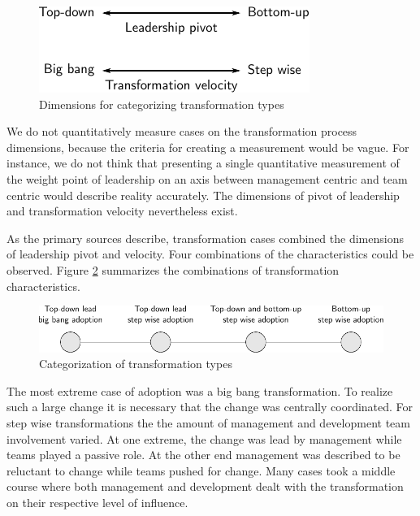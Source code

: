 \begin{figure}[h]
  \begin{center}
    \includegraphics{graphics/transformation_dimensions.pdf}
    \caption{Dimensions for categorizing transformation types}
    \label{fig:transformation_dimensions}
  \end{center}
\end{figure}

We do not quantitatively measure cases on the transformation process dimensions,
because the criteria for creating a measurement would be vague. For instance, we
do not think that presenting a single quantitative measurement of the weight
point of leadership on an axis between management centric and team centric would
describe reality accurately. The dimensions of pivot of leadership and
transformation velocity nevertheless exist.

As the primary sources describe, transformation cases combined the dimensions of
leadership pivot and velocity. Four combinations of the characteristics could be
observed. Figure \ref{fig:transformation_types} summarizes the combinations of
transformation characteristics.

\begin{figure}[h]
  \begin{center}
    \includegraphics[width=1\textwidth]{graphics/transformation_process.pdf}
    \caption{Categorization of transformation types}
    \label{fig:transformation_types}
  \end{center}
\end{figure}

The most extreme case of adoption was a big bang transformation. To realize such
a large change it is necessary that the change was centrally coordinated.
For step wise transformations the the amount of management and development team
involvement varied. At one extreme, the change was lead by management while
teams played a passive role. At the other end management was described to be
reluctant to change while teams pushed for change. Many cases took a middle
course where both management and development dealt with the transformation on
their respective level of influence.

